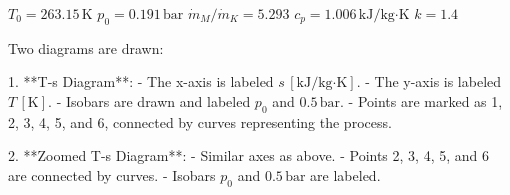 \( T_0 = 263.15 \, \text{K} \)  
\( p_0 = 0.191 \, \text{bar} \)  
\( \dot{m}_M / \dot{m}_K = 5.293 \)  
\( c_p = 1.006 \, \text{kJ/kg·K} \)  
\( k = 1.4 \)  

Two diagrams are drawn:  

1. **T-s Diagram**:  
   - The x-axis is labeled \( s \, [\text{kJ/kg·K}] \).  
   - The y-axis is labeled \( T \, [\text{K}] \).  
   - Isobars are drawn and labeled \( p_0 \) and \( 0.5 \, \text{bar} \).  
   - Points are marked as 1, 2, 3, 4, 5, and 6, connected by curves representing the process.  

2. **Zoomed T-s Diagram**:  
   - Similar axes as above.  
   - Points 2, 3, 4, 5, and 6 are connected by curves.  
   - Isobars \( p_0 \) and \( 0.5 \, \text{bar} \) are labeled.